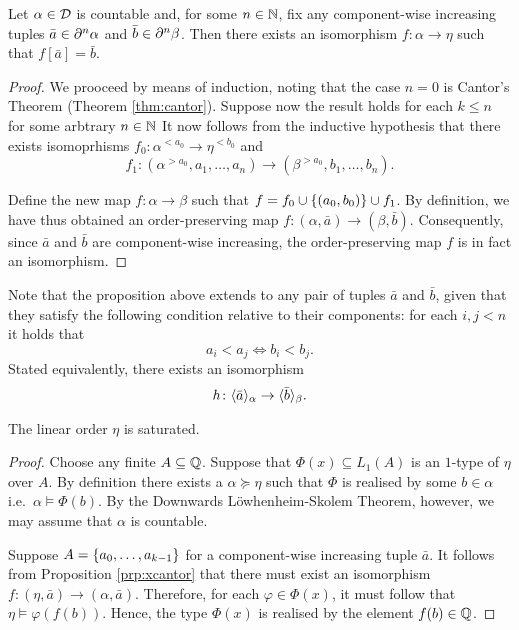 \begin{prp}\label{prp:xcantor}
	Let $\alpha\in\dense$ is countable and, for some $n\in\nats$, fix any
	component-wise increasing tuples $\bar{a}\in\domain[n]{\alpha}$ and
	$\bar{b}\in\domain[n]{\beta}$.  Then there exists an isomorphism
	$f\colon\alpha\to\eta$ such that $f[\bar{a}]=\bar{b}$.
\end{prp}
\begin{proof} We prooceed by means of induction, noting that the case $n=0$ is
	Cantor's Theorem (Theorem \ref{thm:cantor}).  Suppose now the result holds for
	each $k\leq n$ for some arbtrary $n\in\nats$ It now follows from the
	inductive hypothesis that there exists isomoprhisms
	$f_0\colon\alpha^{<a_0}\to\eta^{<b_0}$ and
	\begin{equation}
		f_1\colon(\alpha^{>a_0},a_1,\dotsc,a_n)\to(\beta^{>a_0},b_1,\dotsc,b_n).
	\end{equation}

	Define the new map $f\colon\alpha\to\beta$ such that
	$f=f_0\cup\set{(a_0,b_0)}\cup f_1$.  By definition, we have thus obtained an
	order-preserving map $f\colon(\alpha,\bar{a})\to(\beta,\bar{b})$.
	Consequently, since $\bar{a}$ and $\bar{b}$ are component-wise increasing, the
	order-preserving map $f$ is in fact an isomorphism.
\end{proof}

Note that the proposition above extends to any pair of tuples $\bar{a}$ and
$\bar{b}$, given that they satisfy the following condition relative to their
components: for each $i,j<n$ it holds that
\begin{equation}
	a_{i}<a_{j}\iff b_{i}<b_{j}.
\end{equation}
Stated equivalently, there exists an isomorphism
\begin{equation}
	h\colon\gen{\bar{a}}{\alpha}\to\gen{\bar{b}}{\beta}.
\end{equation}

\begin{prp}
	The linear order $\eta$ is saturated.
\end{prp}
\begin{proof} Choose any finite $A\subseteq\rats$.  Suppose that
	$\Phi(x)\subseteq L_1(A)$ is an $1$-type of $\eta$ over $A$.  By definition
	there exists a $\alpha\succcurlyeq\eta$ such that $\Phi$ is realised by some
	$b\in\alpha$ i.e.\ $\alpha\models\Phi(b)$.  By the Downwards L\"owhenheim-Skolem
	Theorem, however, we may assume that $\alpha$ is countable.

	Suppose $A=\set{a_0,\dotsc,a_{k-1}}$ for a component-wise increasing tuple
	$\bar{a}$.  It follows from Proposition \ref{prp:xcantor} that there must
	exist an isomorphism $f\colon(\eta,\bar{a})\to(\alpha,\bar{a})$.  Therefore,
	for each $\varphi\in\Phi(x)$, it must follow that $\eta\models\varphi(f(b))$.
	Hence, the type $\Phi(x)$ is realised by the element $f(b)\in\rats$.
\end{proof}


